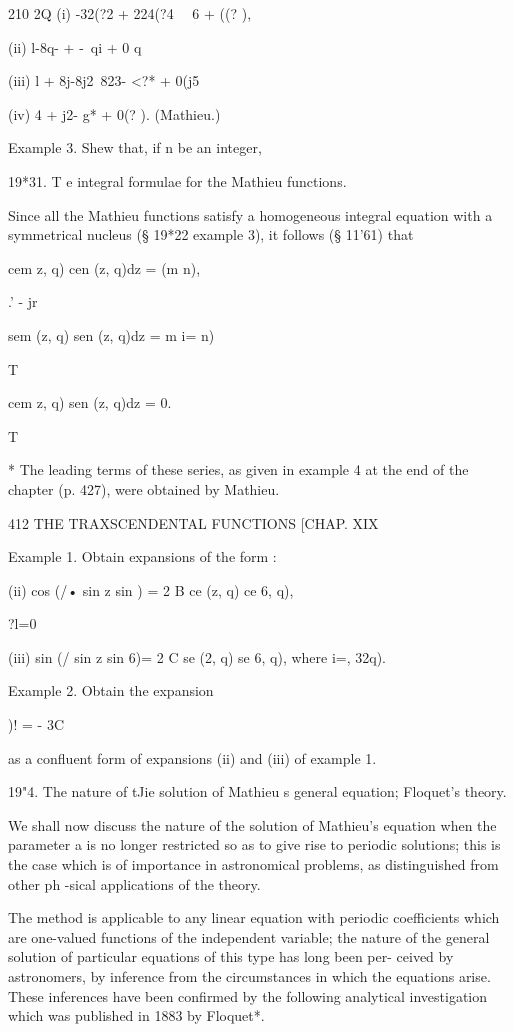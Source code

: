 210 2Q (i) -32(?2 + 224(?4 \ \, 6 + ((? ),

(ii) l-8q- + -\ qi + 0 q%

(iii) l + 8j-8j2\ 823- <?* + 0(j5

(iv) 4 + j2- g* + 0(? ). (Mathieu.)

Example 3. Shew that, if n be an integer,

19*31. T e integral formulae for the Mathieu functions.

Since all the Mathieu functions satisfy a homogeneous integral
equation with a symmetrical nucleus (§ 19*22 example 3), it follows (§
11'61) that

cem z, q) cen (z, q)dz = (m n),

.' - jr

sem (z, q) sen (z, q)dz = m i= n)

T

cem z, q) sen (z, q)dz = 0.

T

* The leading terms of these series, as given in example 4 at the end
of the chapter (p. 427), were obtained by Mathieu.

412 THE TRAXSCENDENTAL FUNCTIONS [CHAP. XIX

Example 1. Obtain expansions of the form :

(ii) cos (/• sin z sin ) = 2 B ce (z, q) ce 6, q),

?l=0

(iii) sin (/ sin z sin 6)= 2 C se (2, q) se 6, q), where i=, 32q).

Example 2. Obtain the expansion

)! = - 3C

as a confluent form of expansions (ii) and (iii) of example 1.

19"4. The nature of tJie solution of Mathieu s general equation;
Floquet's theory.

We shall now discuss the nature of the solution of Mathieu's equation
when the parameter a is no longer restricted so as to give rise to
periodic solutions; this is the case which is of importance in
astronomical problems, as distinguished from other ph -sical
applications of the theory.

The method is applicable to any linear equation with periodic
coefficients which are one-valued functions of the independent
variable; the nature of the general solution of particular equations
of this type has long been per- ceived by astronomers, by inference
from the circumstances in which the equations arise. These inferences
have been confirmed by the following analytical investigation which
was published in 1883 by Floquet*.

